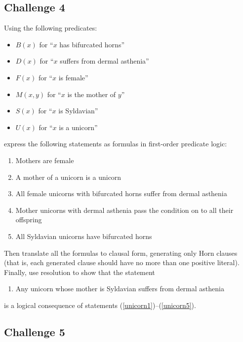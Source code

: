 \documentclass[12pt]{article}
\begin{document}
\subsection*{Challenge 4}
Using the following predicates:
\begin{itemize}
\setlength{\itemsep}{-0.5ex}
\item
$B(x)$ for ``$x$ has bifurcated horns''
\item
$D(x)$ for ``$x$ suffers from dermal asthenia''
\item
$F(x)$ for ``$x$ is female''
\item
$M(x,y)$ for ``$x$ is the mother of $y$''
\item
$S(x)$ for ``$x$ is Syldavian''
\item
$U(x)$ for ``$x$ is a unicorn''
\end{itemize}
express the following statements as formulas in first-order
predicate logic:
\begin{enumerate}
\setlength{\itemsep}{-0.5ex}
\item
\label{unicorn1}
Mothers are female
\item
\label{unicorn2}
A mother of a unicorn is a unicorn
\item
\label{unicorn3}
All female unicorns with bifurcated horns suffer from dermal asthenia
\item
\label{unicorn4}
Mother unicorns with dermal asthenia pass the condition on to
all their offspring
\item
\label{unicorn5}
All Syldavian unicorns have bifurcated horns
\end{enumerate}
Then translate all the formulas to clausal form,
generating only Horn clauses (that is, each generated clause should
have no more than one positive literal).
%
Finally, use resolution to show that the statement
\begin{enumerate}
\setcounter{enumi}{5}
\item
Any unicorn whose mother is Syldavian suffers from dermal asthenia
\end{enumerate}
is a logical consequence of statements (\ref{unicorn1})--(\ref{unicorn5}).

\subsection*{Challenge 5}
\end{document}
